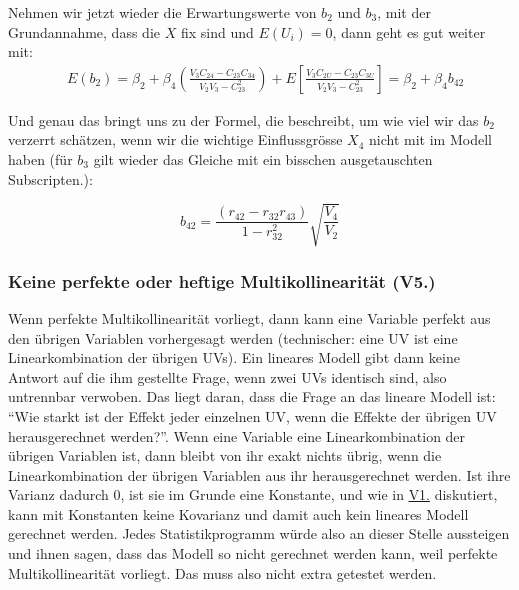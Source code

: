 \documentclass[
  10pt,
  letterpaper,
  a4paper, twoside]{scrreprt}
\begin{document}
\begin{tcolorbox}
Nehmen wir jetzt wieder die Erwartungswerte von \(b_2\) und \(b_3\), mit
der Grundannahme, dass die \(X\) fix sind und \(E\left(U_i\right)=0\),
dann geht es gut weiter mit: \begin{align}
& E\left(b_2\right)=\beta_2+\beta_4\left(\frac{V_3 C_{24}-C_{23} C_{34}}{V_2 V_3-C_{23}^2}\right)+E\left[\frac{V_3 C_{2 U}-C_{23} C_{3 U}}{V_2 V_3-C_{23}^2}\right]=\beta_2+\beta_4 b_{42} 
\end{align}

Und genau das bringt uns zu der Formel, die beschreibt, um wie viel wir
das \(b_2\) verzerrt schätzen, wenn wir die wichtige Einflussgrösse
\(X_4\) nicht mit im Modell haben (für \(b_3\) gilt wieder das Gleiche
mit ein bisschen ausgetauschten Subscripten.):

\[
b_{42}=\frac{\left(r_{42}-r_{32} r_{43}\right)}{1-r_{32}^2} \sqrt{\frac{V_4}{V_2}} 
\]

\end{tcolorbox}

\subsubsection{Keine perfekte oder heftige Multikollinearität
(V5.)}\label{keine-perfekte-oder-heftige-multikollinearituxe4t-v5.}

Wenn perfekte Multikollinearität vorliegt, dann kann eine Variable
perfekt aus den übrigen Variablen vorhergesagt werden (technischer: eine
UV ist eine Linearkombination der übrigen UVs). Ein lineares Modell gibt
dann keine Antwort auf die ihm gestellte Frage, wenn zwei UVs identisch
sind, also untrennbar verwoben. Das liegt daran, dass die Frage an das
lineare Modell ist: \enquote{Wie starkt ist der Effekt jeder einzelnen
UV, wenn die Effekte der übrigen UV herausgerechnet werden?}. Wenn eine
Variable eine Linearkombination der übrigen Variablen ist, dann bleibt
von ihr exakt nichts übrig, wenn die Linearkombination der übrigen
Variablen aus ihr herausgerechnet werden. Ist ihre Varianz dadurch 0,
ist sie im Grunde eine Konstante, und wie in \hyperref[sec:V1]{V1.}
diskutiert, kann mit Konstanten keine Kovarianz und damit auch kein
lineares Modell gerechnet werden. Jedes Statistikprogramm würde also an
dieser Stelle aussteigen und ihnen sagen, dass das Modell so nicht
gerechnet werden kann, weil perfekte Multikollinearität vorliegt. Das
muss also nicht extra getestet werden.
\end{document}
